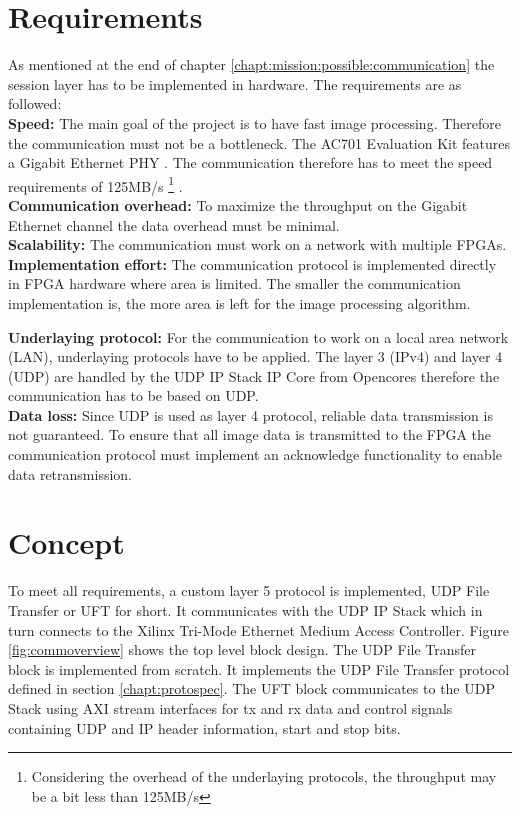 \section{Requirements}
As mentioned at the end of chapter \ref{chapt:mission:possible:communication} the session
layer has to be implemented in hardware. The requirements are as followed:
\\

\textbf{Speed:}
The main goal of the project is to have fast image processing.
Therefore the communication must not be a bottleneck. The AC701
Evaluation Kit features a Gigabit Ethernet PHY \cite{xilinx_ac701}. The
communication therefore has to meet the speed requirements of 125MB/s
\footnote{Considering the overhead of the underlaying protocols, the
throughput may be a bit less than 125MB/s} \cite{8023}.
\\

\textbf{Communication overhead:}
To maximize the throughput on the Gigabit Ethernet channel the data overhead
must be minimal. 
\\

\textbf{Scalability:}
The communication must work on a network with multiple FPGAs.
\\

\textbf{Implementation effort:}
The communication protocol is implemented directly in FPGA hardware where area
is limited. The smaller the communication implementation is, the more area is
left for the image processing algorithm.

\textbf{Underlaying protocol:}
For the communication to work on a local area network (LAN), underlaying protocols
have to be applied. The layer 3 (IPv4) and layer 4 (UDP) are handled by the UDP IP
Stack IP Core from Opencores \cite{udpipstack} therefore the communication has
to be based on UDP.
\\

\textbf{Data loss:}
Since UDP is used as layer 4 protocol, reliable data transmission is not
guaranteed. To ensure that all image data is transmitted to the FPGA the
communication protocol must implement an acknowledge functionality to enable data
retransmission.

%
%
\section{Concept} \label{chapt:comm:concept}
To meet all requirements, a custom layer 5 protocol is implemented, UDP File
Transfer or UFT for short. It communicates with the UDP IP Stack which in turn
connects to the Xilinx Tri-Mode Ethernet Medium Access Controller. Figure 
\ref{fig:commoverview} shows the top level block design. The UDP File Transfer
block is implemented from scratch. It implements the UDP File Transfer protocol
defined in section \ref{chapt:protospec}. The UFT block communicates to the
UDP Stack using AXI stream interfaces for tx and rx data and control signals
containing UDP and IP header information, start and stop bits.


